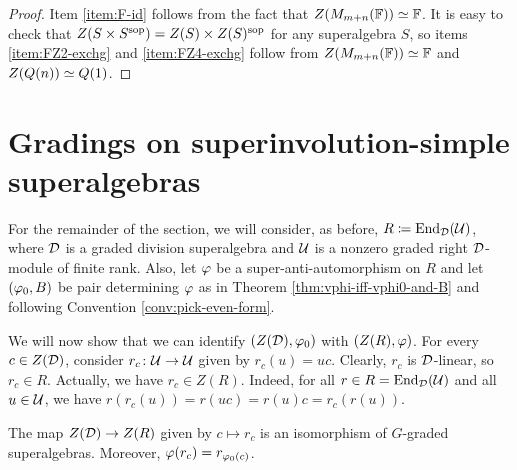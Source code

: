 \begin{proof}
	Item \eqref{item:F-id} follows from the fact that $Z(M_{m+n}(\mathbb{F})) \simeq \mathbb{F}$.
	It is easy to check that $Z(S\times S^{\mathrm{sop}}) = Z(S) \times Z(S)^{\mathrm{sop}}$ for any superalgebra $S$, so items \eqref{item:FZ2-exchg} and \eqref{item:FZ4-exchg} follow from $Z(M_{m+n}(\mathbb{F})) \simeq \mathbb{F}$ and $Z(Q(n)) \simeq Q(1)$.
\end{proof}

\section{Gradings on superinvolution-simple superalgebras}

For the remainder of the section, we will consider, as before, $R \coloneqq \operatorname{End}_{\mathcal{D}}(\mathcal U)$, where $\mathcal{D}$ is a graded division superalgebra and $\mathcal U$ is a nonzero graded right $\mathcal{D}$-module of finite rank.
Also, let $\varphi$ be a super-anti-automorphism on $R$ and let $(\varphi_0, B)$ be pair determining $\varphi$ as in Theorem \ref{thm:vphi-iff-vphi0-and-B} and following Convention \ref{conv:pick-even-form}.

We will now show that we can identify $(Z(\mathcal{D}), \varphi_0)$ with $(Z(R), \varphi)$.
For every $c\in Z(\mathcal{D})$, consider $r_c\colon \mathcal U \to \mathcal U$ given by $r_c(u) = uc$.
Clearly, $r_c$ is $\mathcal{D}$-linear, so $r_c \in R$.
Actually, we have $r_c\in Z(R)$.
Indeed, for all $r\in R = \operatorname{End}_{\mathcal{D}}(\mathcal U)$ and all $u\in \mathcal U$, we have $r (r_c(u)) = r(uc) = r(u) c = r_c(r(u))$.

\begin{prop}%
	The map $Z(\mathcal{D}) \to Z(R)$ given by $c \mapsto r_c$ is an isomorphism of $G$-graded superalgebras.
	Moreover, $\varphi (r_c) = r_{\varphi_0(c)}$.
\end{prop}

